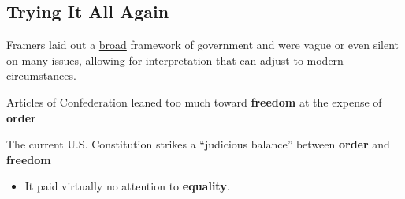 \subsection{Trying It All Again}
Framers laid out a \underline{broad} framework of government and were vague or even silent on many issues, allowing for interpretation that can adjust to modern circumstances.

Articles of Confederation leaned too much toward \textbf{freedom} at the expense of \textbf{order}

The current U.S. Constitution strikes a ``judicious balance'' between \textbf{order} and \textbf{freedom}
\begin{itemize}
    \item It paid virtually no attention to \textbf{equality}.
\end{itemize}